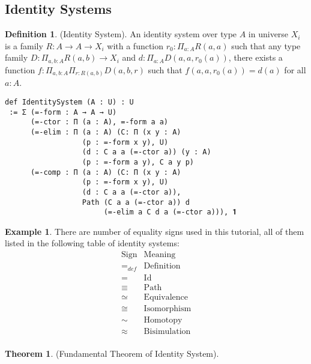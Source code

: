 \documentclass{article}
\theoremstyle{definition}
\newtheorem{definition}{Definition}
\newtheorem{theorem}{Theorem}
\newtheorem{example}{Example}
\begin{document}
\subsection{Identity Systems}
\begin{definition} (Identity System).
An identity system over type $A$ in universe $X_i$ is a
family $R : A \rightarrow A \rightarrow X_i$ with a function
$r_0: \Pi_{a:A}R(a,a)$ such that any type family
$D : \Pi_{a,b:A}R(a,b) \rightarrow X_i$ and
$d: \Pi_{a:A}D(a,a,r_0(a))$, there exists a function
$f: \Pi_{a,b:A}\Pi_{r:R(a,b)}D(a,b,r)$ such that
$f(a,a,r_0(a))=d(a)$ for all $a:A$.
\begin{lstlisting}
def IdentitySystem (A : U) : U
 := Σ (=-form : A → A → U)
      (=-ctor : Π (a : A), =-form a a)
      (=-elim : Π (a : A) (C: Π (x y : A)
                  (p : =-form x y), U)
                  (d : C a a (=-ctor a)) (y : A)
                  (p : =-form a y), C a y p)
      (=-comp : Π (a : A) (C: Π (x y : A)
                  (p : =-form x y), U)
                  (d : C a a (=-ctor a)),
                  Path (C a a (=-ctor a)) d
                       (=-elim a C d a (=-ctor a))), 𝟏
\end{lstlisting}
\end{definition}

\begin{example}
There are number of equality signs used in this tutorial,
all of them listed in the following table of identity systems:
$$
\begin{array}{ll} \mathrm{Sign} & \mathrm{Meaning} \\
                         \hline
                        =_{def} & \mathrm{Definition} \\
                              = & \mathrm{Id} \\
                         \equiv & \mathrm{Path} \\
                         \simeq & \mathrm{Equivalence} \\
                          \cong & \mathrm{Isomorphism} \\
                           \sim & \mathrm{Homotopy} \\
                        \approx & \mathrm{Bisimulation} \\
                      \end{array}
$$
\end{example}

\begin{theorem} (Fundamental Theorem of Identity System).
\end{theorem}
\end{document}
